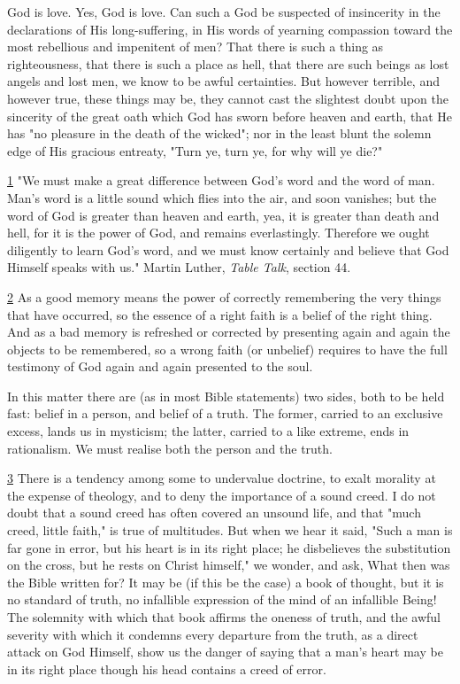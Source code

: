 \documentclass[
]{book}
\begin{document}
God is love. Yes, God is love. Can such a God be suspected of insincerity in the declarations of His long-suffering, in His words of yearning compassion toward the most rebellious and impenitent of men? That there is such a thing as righteousness, that there is such a place as hell, that there are such beings as lost angels and lost men, we know to be awful certainties. But however terrible, and however true, these things may be, they cannot cast the slightest doubt upon the sincerity of the great oath which God has sworn before heaven and earth, that He has "no pleasure in the death of the wicked"; nor in the least blunt the solemn edge of His gracious entreaty, "Turn ye, turn ye, for why will ye die?"

\protect\hyperlink{sdfootnote1anc}{1} "We must make a great difference between God's word and the word of man. Man's word is a little sound which flies into the air, and soon vanishes; but the word of God is greater than heaven and earth, yea, it is greater than death and hell, for it is the power of God, and remains everlastingly. Therefore we ought diligently to learn God's word, and we must know certainly and believe that God Himself speaks with us." Martin Luther, \emph{Table Talk}, section 44.

\protect\hyperlink{sdfootnote2anc}{2} As a good memory means the power of correctly remembering the very things that have occurred, so the essence of a right faith is a belief of the right thing. And as a bad memory is refreshed or corrected by presenting again and again the objects to be remembered, so a wrong faith (or unbelief) requires to have the full testimony of God again and again presented to the soul.

In this matter there are (as in most Bible statements) two sides, both to be held fast: belief in a person, and belief of a truth. The former, carried to an exclusive excess, lands us in mysticism; the latter, carried to a like extreme, ends in rationalism. We must realise both the person and the truth.

\protect\hyperlink{sdfootnote3anc}{3} There is a tendency among some to undervalue doctrine, to exalt morality at the expense of theology, and to deny the importance of a sound creed. I do not doubt that a sound creed has often covered an unsound life, and that "much creed, little faith," is true of multitudes. But when we hear it said, "Such a man is far gone in error, but his heart is in its right place; he disbelieves the substitution on the cross, but he rests on Christ himself," we wonder, and ask, What then was the Bible written for? It may be (if this be the case) a book of thought, but it is no standard of truth, no infallible expression of the mind of an infallible Being! The solemnity with which that book affirms the oneness of truth, and the awful severity with which it condemns every departure from the truth, as a direct attack on God Himself, show us the danger of saying that a man's heart may be in its right place though his head contains a creed of error.
\end{document}
